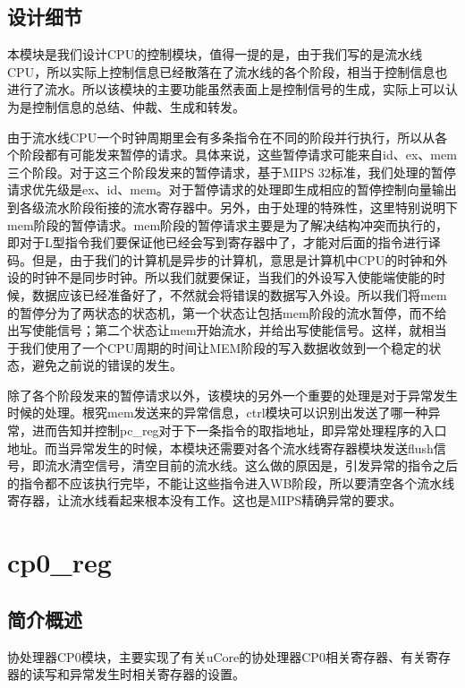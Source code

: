     \subsection{设计细节}
    本模块是我们设计CPU的控制模块，值得一提的是，由于我们写的是流水线CPU，所以实际上控制信息已经散落在了流水线的各个阶段，相当于控制信息也进行了流水。所以该模块的主要功能虽然表面上是控制信号的生成，实际上可以认为是控制信息的总结、仲裁、生成和转发。

    由于流水线CPU一个时钟周期里会有多条指令在不同的阶段并行执行，所以从各个阶段都有可能发来暂停的请求。具体来说，这些暂停请求可能来自id、ex、mem三个阶段。对于这三个阶段发来的暂停请求，基于MIPS 32标准，我们处理的暂停请求优先级是ex、id、mem。对于暂停请求的处理即生成相应的暂停控制向量输出到各级流水阶段衔接的流水寄存器中。另外，由于处理的特殊性，这里特别说明下mem阶段的暂停请求。mem阶段的暂停请求主要是为了解决结构冲突而执行的，即对于L型指令我们要保证他已经会写到寄存器中了，才能对后面的指令进行译码。但是，由于我们的计算机是异步的计算机，意思是计算机中CPU的时钟和外设的时钟不是同步时钟。所以我们就要保证，当我们的外设写入使能端使能的时候，数据应该已经准备好了，不然就会将错误的数据写入外设。所以我们将mem的暂停分为了两状态的状态机，第一个状态让包括mem阶段的流水暂停，而不给出写使能信号；第二个状态让mem开始流水，并给出写使能信号。这样，就相当于我们使用了一个CPU周期的时间让MEM阶段的写入数据收敛到一个稳定的状态，避免之前说的错误的发生。

    除了各个阶段发来的暂停请求以外，该模块的另外一个重要的处理是对于异常发生时候的处理。根究mem发送来的异常信息，ctrl模块可以识别出发送了哪一种异常，进而告知并控制pc\_reg对于下一条指令的取指地址，即异常处理程序的入口地址。而当异常发生的时候，本模块还需要对各个流水线寄存器模块发送flush信号，即流水清空信号，清空目前的流水线。这么做的原因是，引发异常的指令之后的指令都不应该执行完毕，不能让这些指令进入WB阶段，所以要清空各个流水线寄存器，让流水线看起来根本没有工作。这也是MIPS精确异常的要求。
    
\section{cp0\_reg}

    \subsection{简介概述}
    协处理器CP0模块，主要实现了有关uCore的协处理器CP0相关寄存器、有关寄存器的读写和异常发生时相关寄存器的设置。
    
